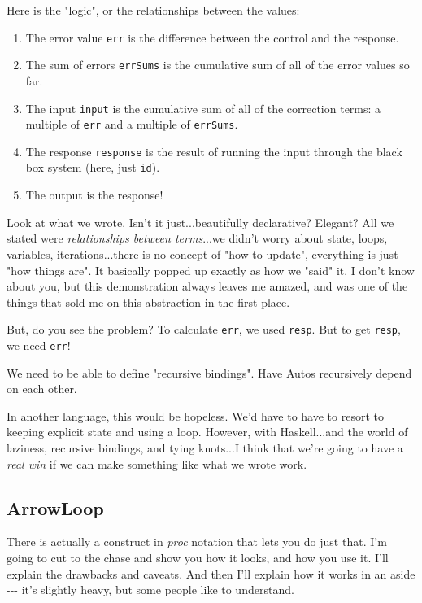 \documentclass[]{article}
\begin{document}
Here is the "logic", or the relationships between the values:

\begin{enumerate}
\tightlist
\item
  The error value \texttt{err} is the difference between the control and the
  response.
\item
  The sum of errors \texttt{errSums} is the cumulative sum of all of the error
  values so far.
\item
  The input \texttt{input} is the cumulative sum of all of the correction terms:
  a multiple of \texttt{err} and a multiple of \texttt{errSums}.
\item
  The response \texttt{response} is the result of running the input through the
  black box system (here, just \texttt{id}).
\item
  The output is the response!
\end{enumerate}

Look at what we wrote. Isn't it just...beautifully declarative? Elegant? All we
stated were \emph{relationships between terms}...we didn't worry about state,
loops, variables, iterations...there is no concept of "how to update",
everything is just "how things are". It basically popped up exactly as how we
"said" it. I don't know about you, but this demonstration always leaves me
amazed, and was one of the things that sold me on this abstraction in the first
place.

But, do you see the problem? To calculate \texttt{err}, we used \texttt{resp}.
But to get \texttt{resp}, we need \texttt{err}!

We need to be able to define "recursive bindings". Have Autos recursively depend
on each other.

In another language, this would be hopeless. We'd have to have to resort to
keeping explicit state and using a loop. However, with Haskell...and the world
of laziness, recursive bindings, and tying knots...I think that we're going to
have a \emph{real win} if we can make something like what we wrote work.

\subsection{ArrowLoop}

There is actually a construct in \emph{proc} notation that lets you do just
that. I'm going to cut to the chase and show you how it looks, and how you use
it. I'll explain the drawbacks and caveats. And then I'll explain how it works
in an aside -\/-\/- it's slightly heavy, but some people like to understand.
\end{document}
